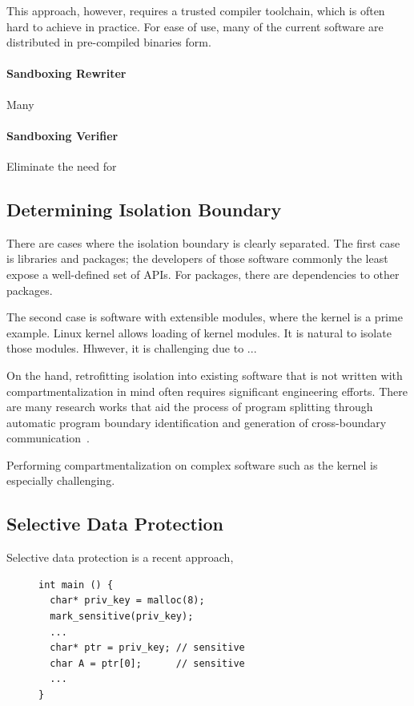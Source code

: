 \documentclass[11pt]{memoir}
\begin{document}
This approach, however, requires a trusted compiler toolchain, which is often hard to achieve in practice.
For ease of use, many of the current software are distributed in pre-compiled binaries form.

\paragraph{Sandboxing Rewriter}
Many 


\paragraph{Sandboxing Verifier}
Eliminate the need for 


\subsection{Determining Isolation Boundary}
There are cases where the isolation boundary is clearly separated.
The first case is libraries and packages; the developers of those software commonly  the least expose a well-defined set of APIs.
For packages, there are dependencies to other packages.

The second case is software with extensible modules, where the kernel is a prime example.
Linux kernel allows loading of kernel modules. 
It is natural to isolate those modules.
Hhwever, it is challenging due to ...


On the hand, retrofitting isolation into existing software that is not written with compartmentalization in mind often requires significant engineering efforts.
There are many research works that aid the process of program splitting through automatic program boundary identification and generation of cross-boundary communication~\cite{huang2022ksplit,kilpatrick2003privman,bittauwedge,liu2017ptrsplit,gudka2015clean,lind2017glamdring,almakhdhub2020mu}.


Performing compartmentalization on complex software such as the kernel is especially challenging.



\subsection{Selective Data Protection}
Selective data protection is a recent approach, 

\begin{figure}
\begin{verbatim}
int main () {
  char* priv_key = malloc(8);
  mark_sensitive(priv_key);
  ...
  char* ptr = priv_key; // sensitive
  char A = ptr[0];      // sensitive
  ...
}
\end{verbatim}
\label{lst:sensitive-annot}
\end{figure}
\end{document}
